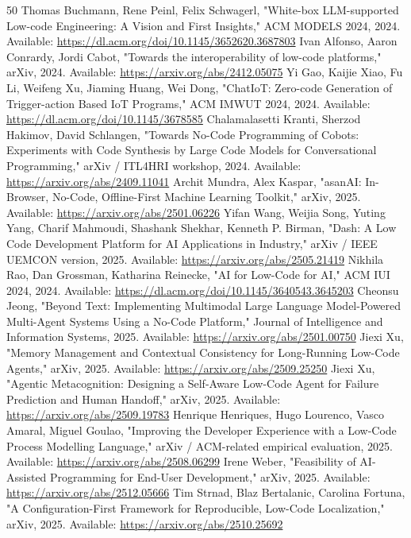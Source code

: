 \documentclass[conference]{IEEEtran}
\begin{document}
\begin{thebibliography}{50}
 Thomas Buchmann, Rene Peinl, Felix Schwagerl, "White-box LLM-supported Low-code Engineering: A Vision and First Insights," ACM MODELS 2024, 2024. Available: \url{https://dl.acm.org/doi/10.1145/3652620.3687803}
 Ivan Alfonso, Aaron Conrardy, Jordi Cabot, "Towards the interoperability of low-code platforms," arXiv, 2024. Available: \url{https://arxiv.org/abs/2412.05075}
 Yi Gao, Kaijie Xiao, Fu Li, Weifeng Xu, Jiaming Huang, Wei Dong, "ChatIoT: Zero-code Generation of Trigger-action Based IoT Programs," ACM IMWUT 2024, 2024. Available: \url{https://dl.acm.org/doi/10.1145/3678585}
 Chalamalasetti Kranti, Sherzod Hakimov, David Schlangen, "Towards No-Code Programming of Cobots: Experiments with Code Synthesis by Large Code Models for Conversational Programming," arXiv / ITL4HRI workshop, 2024. Available: \url{https://arxiv.org/abs/2409.11041}
 Archit Mundra, Alex Kaspar, "asanAI: In-Browser, No-Code, Offline-First Machine Learning Toolkit," arXiv, 2025. Available: \url{https://arxiv.org/abs/2501.06226}
 Yifan Wang, Weijia Song, Yuting Yang, Charif Mahmoudi, Shashank Shekhar, Kenneth P. Birman, "Dash: A Low Code Development Platform for AI Applications in Industry," arXiv / IEEE UEMCON version, 2025. Available: \url{https://arxiv.org/abs/2505.21419}
 Nikhila Rao, Dan Grossman, Katharina Reinecke, "AI for Low-Code for AI," ACM IUI 2024, 2024. Available: \url{https://dl.acm.org/doi/10.1145/3640543.3645203}
 Cheonsu Jeong, "Beyond Text: Implementing Multimodal Large Language Model-Powered Multi-Agent Systems Using a No-Code Platform," Journal of Intelligence and Information Systems, 2025. Available: \url{https://arxiv.org/abs/2501.00750}
 Jiexi Xu, "Memory Management and Contextual Consistency for Long-Running Low-Code Agents," arXiv, 2025. Available: \url{https://arxiv.org/abs/2509.25250}
 Jiexi Xu, "Agentic Metacognition: Designing a Self-Aware Low-Code Agent for Failure Prediction and Human Handoff," arXiv, 2025. Available: \url{https://arxiv.org/abs/2509.19783}
 Henrique Henriques, Hugo Lourenco, Vasco Amaral, Miguel Goulao, "Improving the Developer Experience with a Low-Code Process Modelling Language," arXiv / ACM-related empirical evaluation, 2025. Available: \url{https://arxiv.org/abs/2508.06299}
 Irene Weber, "Feasibility of AI-Assisted Programming for End-User Development," arXiv, 2025. Available: \url{https://arxiv.org/abs/2512.05666}
 Tim Strnad, Blaz Bertalanic, Carolina Fortuna, "A Configuration-First Framework for Reproducible, Low-Code Localization," arXiv, 2025. Available: \url{https://arxiv.org/abs/2510.25692}

\end{thebibliography}
\end{document}
